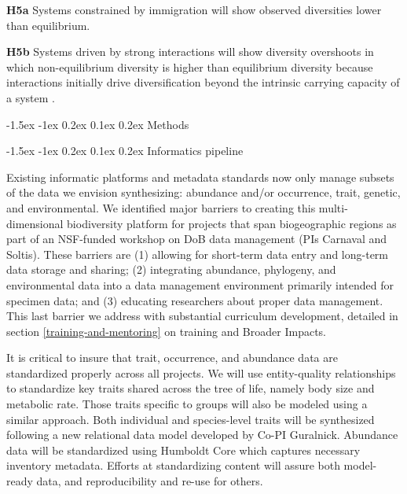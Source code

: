 \documentclass[11pt]{article}
\makeatletter
\renewcommand\subsection{\@startsection{subsection}{1}{\z@}%
                                  {-1.5ex \@plus -1ex \@minus 0.2ex}%
                                  {0.1ex \@plus 0.2ex}%
                                  {\normalfont\large\bfseries}}
\renewcommand\subsubsection{\@startsection{subsection}{1}{\z@}%
                                  {-1.5ex \@plus -1ex \@minus 0.2ex}%
                                  {0.1ex \@plus 0.2ex}%
                                  {\normalfont\bfseries}}
\makeatother
\begin{document}
\begin{adjustwidth}{2.5em}{0pt}
\hspace{1.5em}\textbf{H5a} Systems constrained by immigration \citep[e.g.~arthropod
communities on young substrates in Hawaii;][]{Rominger2015-kb} will
show observed diversities lower than equilibrium.

\textbf{H5b} Systems driven by strong interactions will show diversity
overshoots in which non-equilibrium diversity is higher than equilibrium
diversity because interactions initially drive diversification beyond
the intrinsic carrying capacity of a system \cite{Gillespie2010-bv}.
\end{adjustwidth}

\subsection{Methods}\label{methods}

\subsubsection{Informatics pipeline}\label{informatics-pipeline}

Existing informatic platforms and metadata standards now only manage
subsets of the data we envision synthesizing: abundance and/or
occurrence, trait, genetic, and environmental. We identified major
barriers to creating this multi-dimensional biodiversity platform for
projects that span biogeographic regions as part of an NSF-funded
workshop on DoB data management (PIs Carnaval and Soltis). These
barriers are (1) allowing for short-term data entry and long-term data
storage and sharing; (2) integrating abundance, phylogeny, and
environmental data into a data management environment primarily
intended for specimen data; and (3) educating researchers about proper
data management. This last barrier we address with substantial
curriculum development, detailed in section
\ref{training-and-mentoring} on training and Broader Impacts.

It is critical to insure that trait, occurrence, and abundance data
are standardized properly across all projects. We will use
entity-quality relationships to standardize key traits shared across
the tree of life, namely body size and metabolic rate. Those traits
specific to groups will also be modeled using a similar approach. Both
individual and species-level traits will be synthesized following a
new relational data model developed by Co-PI Guralnick.  Abundance
data will be standardized using Humboldt Core \cite{Guralnick2017-xb}
which captures necessary inventory metadata. Efforts at standardizing
content will assure both model-ready data, and reproducibility and
re-use for others.
\end{document}
